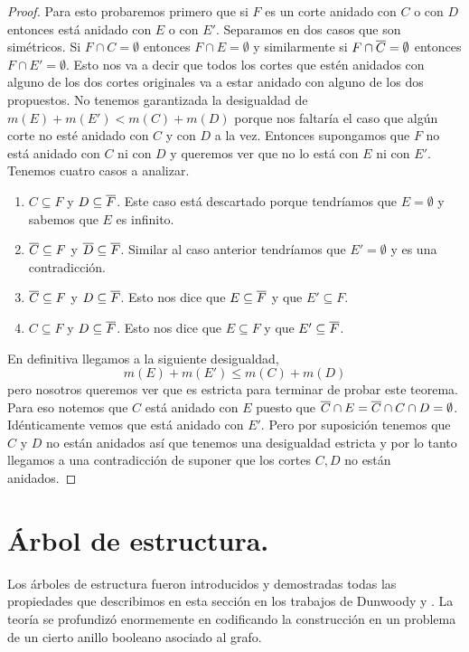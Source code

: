 \documentclass[tesis.tex]{subfiles}
\begin{document}
\begin{proof}
	Para esto probaremos primero que si $F$ es un corte anidado con $C$ o con $D$ entonces está anidado con $E$ o con $E'$.
	Separamos en dos casos que son simétricos.
	Si $F \cap C = \emptyset$ entonces $F \cap E= \emptyset$ y similarmente si $F \cap \overline C = \emptyset$ entonces $F \cap E' = \emptyset$.
	Esto nos va a decir que todos los cortes que estén anidados con alguno de los dos cortes originales va a estar anidado con alguno de los dos propuestos.
	No tenemos garantizada la desigualdad de $m(E) + m(E') < m(C) + m(D)$ porque nos faltaría el caso que algún corte no esté anidado con $C$ y con $D$ a la vez.
	Entonces supongamos que $F$ no está anidado con $C$ ni con $D$ y queremos ver que no lo está con $E$ ni con $E'$.
	Tenemos cuatro casos a analizar.
	\begin{enumerate}
		\item $C \subseteq F$ y $D \subseteq \overline F$.
		Este caso está descartado porque tendríamos que $E=\emptyset$ y sabemos que $E$ es infinito. 
		\item $\overline C \subseteq F$ y $\overline D \subseteq \overline F$.
		Similar al caso anterior tendríamos que $E' = \emptyset$ y es una contradicción.
		\item $\overline C \subseteq F$ y $D \subseteq \overline F$.
		Esto nos dice que $E \subseteq \overline F$ y que $E' \subseteq F$.
		\item $ C \subseteq F$ y $D \subseteq \overline F$.
		Esto nos dice que $E \subseteq F$ y que $E' \subseteq \overline F$.
	\end{enumerate}
	En definitiva llegamos a la siguiente desigualdad,
	\[
		m(E) + m(E') \le m(C) + m(D)
	\]
	pero nosotros queremos ver que es estricta para terminar de probar este teorema.
	Para eso notemos que $C$ está anidado con $E$ puesto que $\overline C \cap E = \overline C \cap C \cap D = \emptyset$.
	Idénticamente vemos que está anidado con $E'$.
	Pero por suposición tenemos que $C$ y $D$ no están anidados así que tenemos una desigualdad estricta y por lo tanto llegamos a una contradicción de suponer que los cortes $C,D$ no están anidados.
\end{proof}

\section{Árbol de estructura.}


Los árboles de estructura fueron introducidos y demostradas todas las propiedades que describimos en esta sección en los trabajos de Dunwoody \cite{dunwoody1979accessibility} y \cite{dunwoody1982cutting}.
La teoría se profundizó enormemente en \cite{dicks1989groups} codificando la construcción en un problema de un cierto anillo booleano asociado al grafo. 
\end{document}
